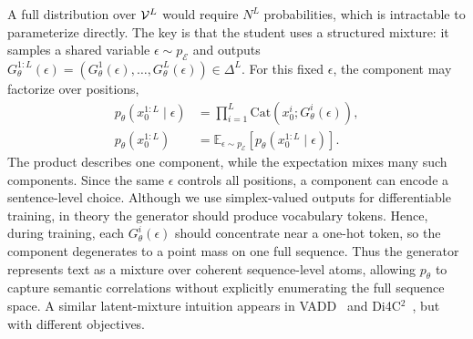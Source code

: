     A full distribution over $\mathcal{V}^L$ would require $N^L$
    probabilities, which is intractable to parameterize directly.
    The key is that the student uses a structured mixture: it samples a
    shared variable $\epsilon\sim p_{\mathcal E}$ and outputs
    $G_\theta^{1:L}(\epsilon)
    =(G_\theta^1(\epsilon),\ldots,G_\theta^L(\epsilon))\in\Delta^L$.
    For this fixed $\epsilon$, the component may factorize over positions,
    \[
    \begin{aligned}
        p_\theta(x_0^{1:L}\mid\epsilon)
        &=
        \prod_{i=1}^L
        \mathrm{Cat}\!\left(x_0^i;G_\theta^i(\epsilon)\right),\\
        p_\theta(x_0^{1:L})
        &=
        \mathbb{E}_{\epsilon\sim p_{\mathcal E}}
        \left[
        p_\theta(x_0^{1:L}\mid\epsilon)
        \right].
    \end{aligned}
    \]
    The product describes one component, while the expectation mixes many
    such components. Since the same $\epsilon$ controls all positions, a
    component can encode a sentence-level choice. Although we use
    simplex-valued outputs for differentiable training, in theory the
    generator should produce vocabulary tokens. Hence, during training, each
    $G_\theta^i(\epsilon)$ should concentrate near a one-hot token, so the
    component degenerates to a point mass on one full sequence. Thus the
    generator represents text as a mixture over coherent sequence-level atoms,
    allowing $p_\theta$ to capture semantic correlations without explicitly
    enumerating the full sequence space.
    A similar latent-mixture intuition appears in VADD~\citep{xie2026variational}
    and Di4C$^2$~\citep{hayakawa2025distillation}, but with different
    objectives.

    
